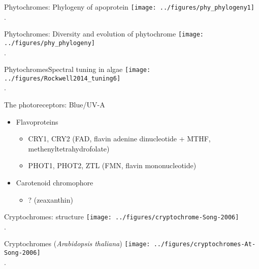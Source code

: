 \documentclass[10pt]{beamer}
\begin{document}
\begin{frame}{Phytochromes: Phylogeny of apoprotein}
    \centering
    \texttt{[image: ../figures/phy\_phylogeny1]}\\
    {\footnotesize \autocite[Fig.\ 1 in][]{Li2015}.}
\end{frame}

\begin{frame}{Phytochromes: Diversity and evolution of phytochrome}
    \centering
    \texttt{[image: ../figures/phy\_phylogeny]}\\
    {\footnotesize \autocite[Fig.\ 2 in][]{Li2015}.}
\end{frame}

\begin{frame}{Phytochromes}{Spectral tuning in algae}
    \centering
    \texttt{[image: ../figures/Rockwell2014\_tuning6]}\\
    {\footnotesize \autocite[Fig.\ 6 in][]{Rockwell2014}.}
\end{frame}

\begin{frame}{The photoreceptors: Blue/UV-A}
    \begin{itemize}
        \item Flavoproteins
        \begin{itemize}
            \item CRY1, CRY2 (FAD, flavin adenine dinucleotide + MTHF, methenyltetrahydrofolate)
            \item PHOT1, PHOT2, ZTL (FMN, flavin mononucleotide)
        \end{itemize}
        \item Carotenoid chromophore
        \begin{itemize}
            \item ? (zeaxanthin)
        \end{itemize}
    \end{itemize}
\end{frame}

\begin{frame}{Cryptochromes: structure}
    \centering
    \texttt{[image: ../figures/cryptochrome-Song-2006]}\\
    {\footnotesize \autocite[from][]{Song2006}.}
\end{frame}

\begin{frame}{Cryptochromes (\emph{Arabidopsis thaliana})}
    \centering
    \texttt{[image: ../figures/cryptochromes-At-Song-2006]}\\
    {\footnotesize \autocite[from][]{Song2006}.}
\end{frame}
\end{document}
